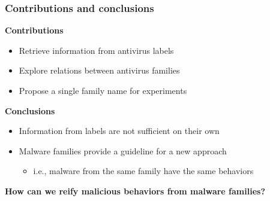 \begin{frame}
    \frametitle{Contributions and conclusions}
    \centering

    \begin{block}{}
        \centering
        \textbf{Contributions}
    \end{block}
    \begin{itemize}
        \item Retrieve information from antivirus labels 
        \item Explore relations between antivirus families 
        \item Propose a single family name for experiments 
    \end{itemize}

    \begin{block}{}
        \centering
        \textbf{Conclusions}
    \end{block}
    \begin{itemize}
        \item Information from labels are not sufficient on their own
        \item Malware families provide a guideline for a new approach
        \begin{itemize}
            \item i.e., malware from the same family have the same behaviors
        \end{itemize}
    \end{itemize}

    \vspace{8pt}
    \small{}

    \textbf{How can we reify malicious behaviors from malware families?}

\end{frame}

